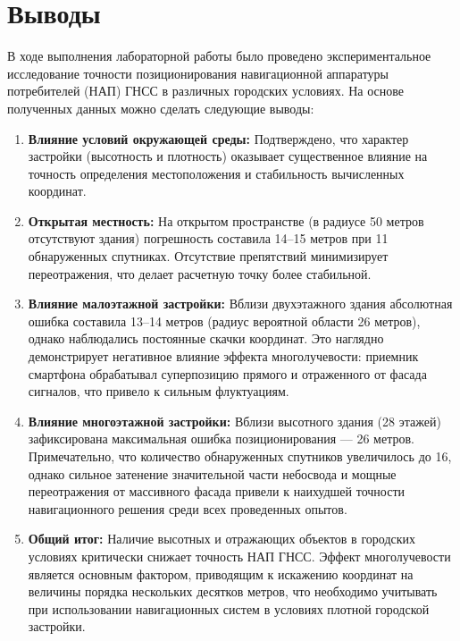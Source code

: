 \section*{Выводы}
В ходе выполнения лабораторной работы было проведено экспериментальное исследование точности позиционирования навигационной аппаратуры потребителей (НАП) ГНСС в различных городских условиях. На основе полученных данных можно сделать следующие выводы:

\begin{enumerate}
    \item \textbf{Влияние условий окружающей среды:} Подтверждено, что характер застройки (высотность и плотность) оказывает существенное влияние на точность определения местоположения и стабильность вычисленных координат.
    \item \textbf{Открытая местность:} На открытом пространстве (в радиусе 50 метров отсутствуют здания) погрешность составила 14--15 метров при 11 обнаруженных спутниках. Отсутствие препятствий минимизирует переотражения, что делает расчетную точку более стабильной.
    \item \textbf{Влияние малоэтажной застройки:} Вблизи двухэтажного здания абсолютная ошибка составила 13--14 метров (радиус вероятной области 26 метров), однако наблюдались постоянные скачки координат. Это наглядно демонстрирует негативное влияние эффекта многолучевости: приемник смартфона обрабатывал суперпозицию прямого и отраженного от фасада сигналов, что привело к сильным флуктуациям.
    \item \textbf{Влияние многоэтажной застройки:} Вблизи высотного здания (28 этажей) зафиксирована максимальная ошибка позиционирования --- 26 метров. Примечательно, что количество обнаруженных спутников увеличилось до 16, однако сильное затенение значительной части небосвода и мощные переотражения от массивного фасада привели к наихудшей точности навигационного решения среди всех проведенных опытов.
    \item \textbf{Общий итог:} Наличие высотных и отражающих объектов в городских условиях критически снижает точность НАП ГНСС. Эффект многолучевости является основным фактором, приводящим к искажению координат на величины порядка нескольких десятков метров, что необходимо учитывать при использовании навигационных систем в условиях плотной городской застройки.
\end{enumerate}
